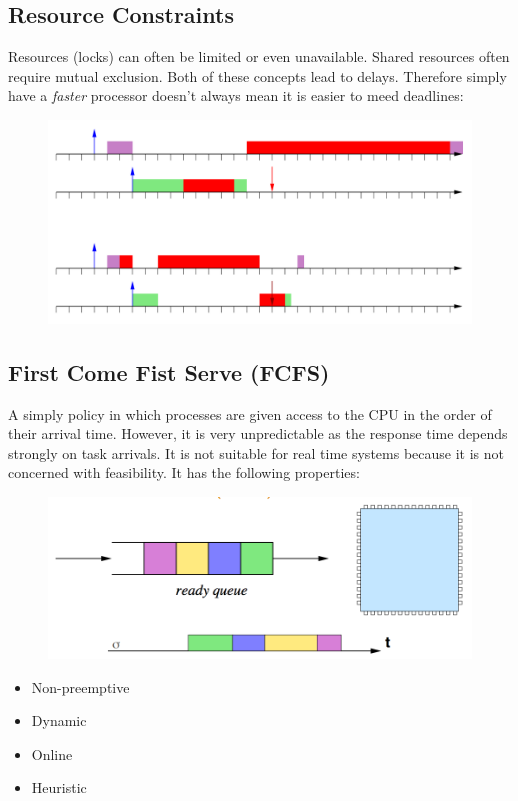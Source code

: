 \documentclass{hw}
\begin{document}
\subsection{Resource Constraints}
Resources (locks) can often be limited or even unavailable. Shared resources 
often require mutual exclusion. Both of these concepts lead to delays. Therefore
simply have a \emph{faster} processor doesn't always mean it is easier to meed
deadlines:
\begin{figure}[H]
  \centering
  \includegraphics[scale=.6]{img/faster}
\end{figure}

\subsection{First Come Fist Serve (FCFS)}
A simply policy in which processes are given access to the CPU in the order of 
their arrival time. However, it is very unpredictable as the response time
depends strongly on task arrivals. It is not suitable for real time systems
because it is not concerned with feasibility. It has the following properties:
\begin{figure}[H]
  \centering
  \includegraphics[scale=.5]{img/fcfs1}
\end{figure}

\begin{itemize}
  \item Non-preemptive
  \item Dynamic
  \item Online
  \item Heuristic
\end{itemize}
\end{document}
